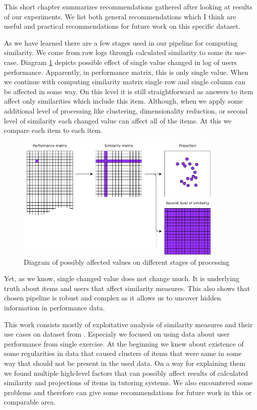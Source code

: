 \documentclass[
  digital, %
  table,   %
  nolof,     %
  nolot,     %
  nocover,
  color
]{fithesis3}
\begin{document}

This short chapter summarizes recommendations gathered after looking at results of our experiments. We list both general recommendations which I think are useful and practical recommendations for future work on this specific dataset.


As we have learned there are a few stages used in our pipeline for computing similarity. We come from raw logs through calculated similarity to some its use-case. Diagram \ref{fig:affected_diagram} depicts possible effect of single value changed in log of users performance. Apparently, in performance matrix, this is only single value. When we continue with computing similarity matrix single row and single column can be affected in some way. On this level it is still straightforward as answers to item affect only similarities which include this item. Although, when we apply some additional level of processing like clustering, dimensionality reduction, or second level of similarity each changed value can affect all of the items. At this we compare each item to each item.

\begin{figure}
  \includegraphics[width=10cm]{img/affected_diagram}
  \caption{Diagram of possibly affected values on different stages of processing}
  \label{fig:affected_diagram}
\end{figure}

Yet, as we know, single changed value does not change much. It is underlying truth about items and users that affect similarity measures. This also shows that chosen pipeline is robust and complex as it allows us to uncover hidden information in performance data.

This work consists mostly of exploitative analysis of similarity measures and their use cases on dataset from \umimeCesky{}. Especialy we focused on using data about user performance from single exercise. At the beginning we knew about existence of some regularities in data that caused clusters of items that were same in some way that should not be present in the used data. On a way for explaining them we found multiple high-level factors that can possibly affect results of calculated similarity and projections of items in tutoring systems. We also encountered some problems and therefore can give some recommendations for future work in this or comparable area.
\end{document}
